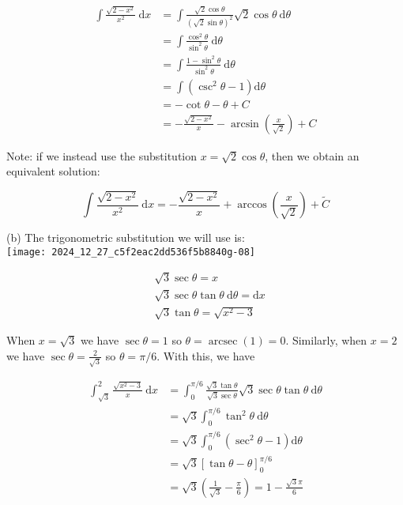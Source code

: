 \documentclass[10pt]{article}
\begin{document}
$$
\begin{aligned}
\int \frac{\sqrt{2-x^{2}}}{x^{2}} \mathrm{~d} x & =\int \frac{\sqrt{2} \cos \theta}{(\sqrt{2} \sin \theta)^{2}} \sqrt{2} \cos \theta \mathrm{~d} \theta \\
& =\int \frac{\cos ^{2} \theta}{\sin ^{2} \theta} \mathrm{~d} \theta \\
& =\int \frac{1-\sin ^{2} \theta}{\sin ^{2} \theta} \mathrm{~d} \theta \\
& =\int\left(\csc ^{2} \theta-1\right) \mathrm{d} \theta \\
& =-\cot \theta-\theta+C \\
& =-\frac{\sqrt{2-x^{2}}}{x}-\arcsin \left(\frac{x}{\sqrt{2}}\right)+C
\end{aligned}
$$

Note: if we instead use the substitution $x=\sqrt{2} \cos \theta$, then we obtain an equivalent solution:

$$
\int \frac{\sqrt{2-x^{2}}}{x^{2}} \mathrm{~d} x=-\frac{\sqrt{2-x^{2}}}{x}+\arccos \left(\frac{x}{\sqrt{2}}\right)+\widetilde{C}
$$

(b) The trigonometric substitution we will use is:\\
\texttt{[image: 2024\_12\_27\_c5f2eac2dd536f5b8840g-08]}

$$
\begin{aligned}
& \sqrt{3} \sec \theta=x \\
& \sqrt{3} \sec \theta \tan \theta \mathrm{~d} \theta=\mathrm{d} x \\
& \sqrt{3} \tan \theta=\sqrt{x^{2}-3}
\end{aligned}
$$

When $x=\sqrt{3}$ we have $\sec \theta=1$ so $\theta=\operatorname{arcsec}(1)=0$. Similarly, when $x=2$ we have $\sec \theta=\frac{2}{\sqrt{3}}$ so $\theta=\pi / 6$. With this, we have

$$
\begin{aligned}
\int_{\sqrt{3}}^{2} \frac{\sqrt{x^{2}-3}}{x} \mathrm{~d} x & =\int_{0}^{\pi / 6} \frac{\sqrt{3} \tan \theta}{\sqrt{3} \sec \theta} \sqrt{3} \sec \theta \tan \theta \mathrm{~d} \theta \\
& =\sqrt{3} \int_{0}^{\pi / 6} \tan ^{2} \theta \mathrm{~d} \theta \\
& =\sqrt{3} \int_{0}^{\pi / 6}\left(\sec ^{2} \theta-1\right) \mathrm{d} \theta \\
& =\sqrt{3}[\tan \theta-\theta]_{0}^{\pi / 6} \\
& =\sqrt{3}\left(\frac{1}{\sqrt{3}}-\frac{\pi}{6}\right)=1-\frac{\sqrt{3} \pi}{6}
\end{aligned}
$$
\end{document}
